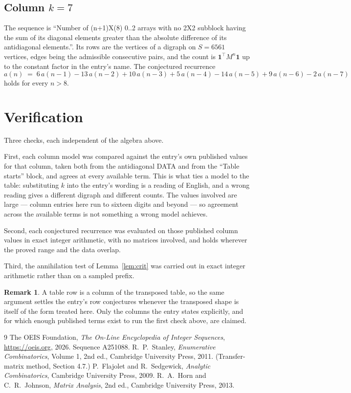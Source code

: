 \documentclass[11pt,a4paper]{article}
\theoremstyle{plain}
\theoremstyle{definition}
\newtheorem{remark}[theorem]{Remark}
\begin{document}
\subsection*{Column $k=7$}
The sequence is ``Number of (n+1)X(8) 0..2 arrays with no 2X2 subblock having the sum of its diagonal elements greater than the absolute difference of its antidiagonal elements.''. Its rows are the vertices of a digraph on
$S=6561$ vertices, edges being the admissible consecutive pairs, and the count is
$\mathbf{1}^{\!\top}M^{n}\mathbf{1}$ up to the constant factor in the entry's name.
The conjectured recurrence
\[
a(n)\;=\;6\,a(n-1) - 13\,a(n-2) + 10\,a(n-3) + 5\,a(n-4) - 14\,a(n-5) + 9\,a(n-6) - 2\,a(n-7)
\]
holds for every $n>8$.

\section{Verification}

Three checks, each independent of the algebra above.

First, each column model was compared against the entry's own published values for that
column, taken both from the antidiagonal DATA and from the ``Table starts'' block, and agrees
at every available term. This is what ties a model to the table: substituting $k$ into the
entry's wording is a reading of English, and a wrong reading gives a different digraph and
different counts. The values involved are large --- column entries here run to sixteen digits
and beyond --- so agreement across the available terms is not something a wrong model
achieves.

Second, each conjectured recurrence was evaluated on those published column values in exact
integer arithmetic, with no matrices involved, and holds wherever the proved range and the
data overlap.

Third, the annihilation test of Lemma~\ref{lem:crit} was carried out in exact integer
arithmetic rather than on a sampled prefix.

\begin{remark}
A table row is a column of the transposed table, so the same argument settles the entry's row
conjectures whenever the transposed shape is itself of the form treated here. Only the columns
the entry states explicitly, and for which enough published terms exist to run the first check
above, are claimed.
\end{remark}

\begin{thebibliography}{9}
 The OEIS Foundation, \emph{The On-Line Encyclopedia of Integer
Sequences}, \url{https://oeis.org}, 2026. Sequence A251088.
 R.~P.~Stanley, \emph{Enumerative Combinatorics}, Volume 1, 2nd ed.,
Cambridge University Press, 2011. (Transfer-matrix method, Section 4.7.)
 P.~Flajolet and R.~Sedgewick, \emph{Analytic Combinatorics}, Cambridge
University Press, 2009.
 R.~A.~Horn and C.~R.~Johnson, \emph{Matrix Analysis}, 2nd ed., Cambridge
University Press, 2013.
\end{thebibliography}
\end{document}
